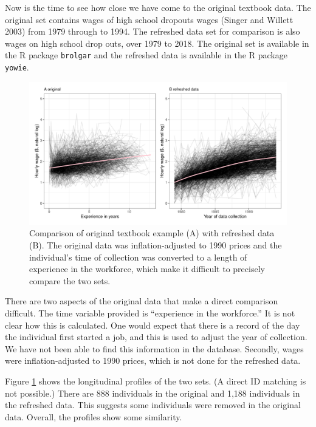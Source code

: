 \documentclass{article}
\begin{document}
Now is the time to see how close we have come to the original textbook data. The original set contains wages of high school dropouts wages (Singer and Willett 2003) from 1979 through to 1994. The refreshed data set for comparison is also wages on high school drop outs, over 1979 to 2018. The original set is available in the R package \texttt{brolgar} and the refreshed data is available in the R package \texttt{yowie}.

\begin{figure}

{\centering \includegraphics[width=1\linewidth]{figures/plotting-sw-do-1} 

}

\caption{Comparison of original textbook example (A) with refreshed data (B). The original data was inflation-adjusted to 1990 prices and the individual's time of collection was converted to a length of experience in the workforce, which make it difficult to precisely compare the two sets.}\label{fig:plotting-sw-do}
\end{figure}

There are two aspects of the original data that make a direct comparison difficult. The time variable provided is ``experience in the workforce.'' It is not clear how this is calculated. One would expect that there is a record of the day the individual first started a job, and this is used to adjust the year of collection. We have not been able to find this information in the database. Secondly, wages were inflation-adjusted to 1990 prices, which is not done for the refreshed data.

Figure \ref{fig:plotting-sw-do} shows the longitudinal profiles of the two sets. (A direct ID matching is not possible.) There are 888 individuals in the original and 1,188 individuals in the refreshed data. This suggests some individuals were removed in the original data. Overall, the profiles show some similarity.
\end{document}
